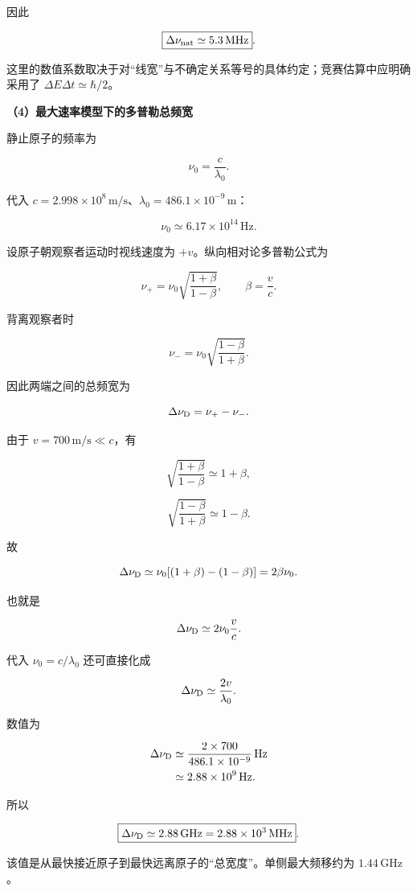 \documentclass[12pt,a4paper,UTF8]{ctexart}
\begin{document}
因此

\[
\boxed{\Delta\nu_{\rm nat}\simeq5.3\,\mathrm{MHz}}.
\]

这里的数值系数取决于对``线宽''与不确定关系等号的具体约定；竞赛估算中应明确采用了
\(\Delta E\Delta t\simeq\hbar/2\)。

\textbf{（4）最大速率模型下的多普勒总频宽}

静止原子的频率为

\[
\nu_0=\frac{c}{\lambda_0}.
\]

代入
\(c=2.998\times10^8\,\mathrm{m/s}\)、\(\lambda_0=486.1\times10^{-9}\,\mathrm m\)：

\[
\nu_0\simeq6.17\times10^{14}\,\mathrm{Hz}.
\]

设原子朝观察者运动时视线速度为 \(+v\)。纵向相对论多普勒公式为

\[
\nu_+=\nu_0\sqrt{\frac{1+\beta}{1-\beta}},
\qquad
\beta=\frac vc.
\]

背离观察者时

\[
\nu_-=\nu_0\sqrt{\frac{1-\beta}{1+\beta}}.
\]

因此两端之间的总频宽为

\[
\Delta\nu_{\rm D}=\nu_+-\nu_-.
\]

由于 \(v=700\,\mathrm{m/s}\ll c\)，有

\[
\sqrt{\frac{1+\beta}{1-\beta}}\simeq1+\beta,
\]

\[
\sqrt{\frac{1-\beta}{1+\beta}}\simeq1-\beta.
\]

故

\[
\Delta\nu_{\rm D}\simeq\nu_0[(1+\beta)-(1-\beta)]
=2\beta\nu_0.
\]

也就是

\[
\Delta\nu_{\rm D}\simeq2\nu_0\frac vc.
\]

代入 \(\nu_0=c/\lambda_0\) 还可直接化成

\[
\Delta\nu_{\rm D}\simeq\frac{2v}{\lambda_0}.
\]

数值为

\[
\begin{aligned}
\Delta\nu_{\rm D}
&\simeq\frac{2\times700}{486.1\times10^{-9}}\,\mathrm{Hz}\\
&\simeq2.88\times10^9\,\mathrm{Hz}.
\end{aligned}
\]

所以

\[
\boxed{
\Delta\nu_{\rm D}\simeq2.88\,\mathrm{GHz}
=2.88\times10^3\,\mathrm{MHz}
}.
\]

该值是从最快接近原子到最快远离原子的``总宽度''。单侧最大频移约为
\(1.44\,\mathrm{GHz}\)。
\end{document}
